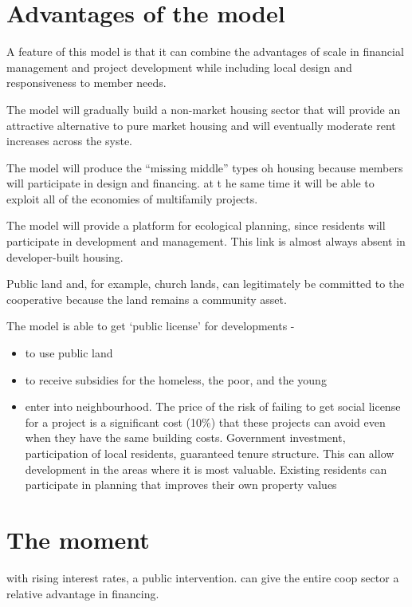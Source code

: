      
\section{Advantages of the model}

A feature of this model is that it can combine the advantages of scale in financial management and project development while including local design and responsiveness to member needs.

The model will gradually build a non-market housing  sector that will provide an attractive alternative to pure market housing and will eventually moderate rent increases across the syste.

The model will produce the ``missing middle'' types oh housing because members will participate in design and financing. at t he same time it will be able to exploit  all of the economies of multifamily projects. 

The model will provide a platform for ecological planning, since residents will participate in development and management. This link is almost always absent in developer-built housing.

Public land and, for example, church lands, can legitimately be committed to the cooperative because the land remains a community asset.

The model is able to get `public license' for developments - \begin{itemize}
    \item to use public land
    \item to receive subsidies for the homeless, the poor, and the young
    \item enter into neighbourhood. The price of the risk of failing to get social license for a project is a significant cost (10\%) that these projects can avoid even when they have the same building costs.  Government investment, participation of local residents, guaranteed  tenure structure. This can allow development in the areas where it is most valuable. Existing residents can participate in planning that improves their own property values
\end{itemize}

\section{The moment}
with rising interest rates, a public intervention. can give the entire coop sector a relative advantage in financing. 






